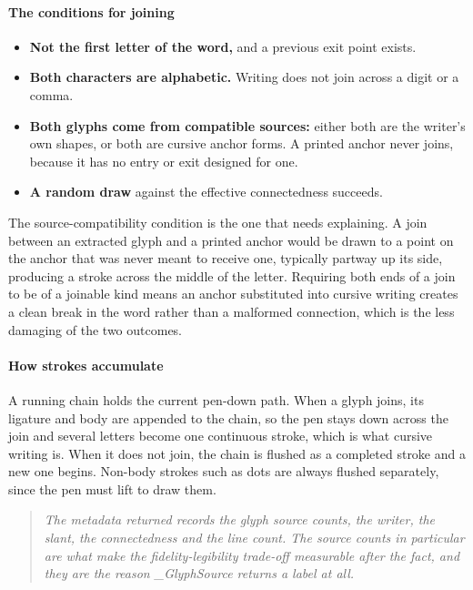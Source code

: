 \paragraph{The conditions for joining}

\begin{itemize}\setlength\itemsep{0pt}
  \item \textbf{Not the first letter of the word,} and a previous exit point exists.
  \item \textbf{Both characters are alphabetic.} Writing does not join across a digit or a comma.
  \item \textbf{Both glyphs come from compatible sources:} either both are the writer's own shapes, or both are cursive anchor forms. A printed anchor never joins, because it has no entry or exit designed for one.
  \item \textbf{A random draw} against the effective connectedness succeeds.
\end{itemize}
The source-compatibility condition is the one that needs explaining. A join between an extracted glyph and a printed anchor would be drawn to a point on the anchor that was never meant to receive one, typically partway up its side, producing a stroke across the middle of the letter. Requiring both ends of a join to be of a joinable kind means an anchor substituted into cursive writing creates a clean break in the word rather than a malformed connection, which is the less damaging of the two outcomes.


\paragraph{How strokes accumulate}
A running chain holds the current pen-down path. When a glyph joins, its ligature and body are appended to the chain, so the pen stays down across the join and several letters become one continuous stroke, which is what cursive writing is. When it does not join, the chain is flushed as a completed stroke and a new one begins. Non-body strokes such as dots are always flushed separately, since the pen must lift to draw them.


\begin{quote}\small\itshape The metadata returned records the glyph source counts, the writer, the slant, the connectedness and the line count. The source counts in particular are what make the fidelity-legibility trade-off measurable after the fact, and they are the reason \_GlyphSource returns a label at all.\end{quote}

